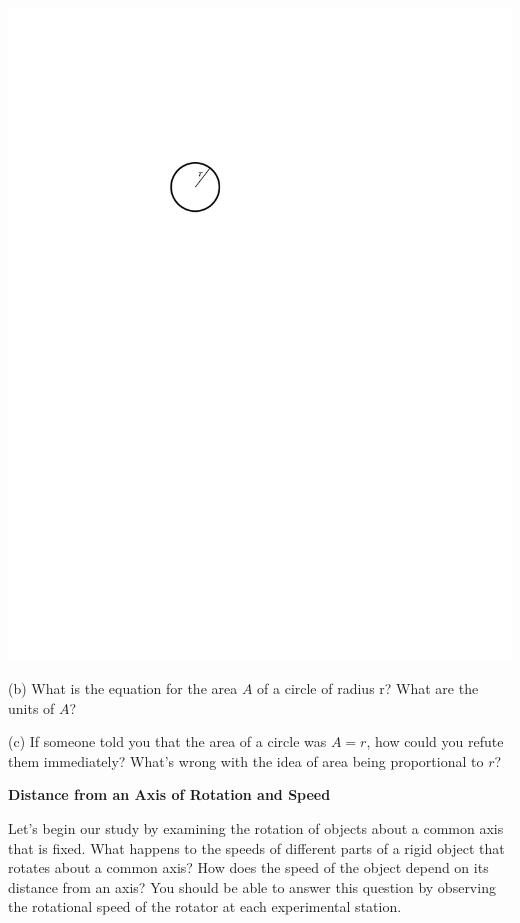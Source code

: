\vspace{0.3cm}
{\par\raggedright \includegraphics{rotation/just_a_circle.pdf} \par}
\answerspace{0.3cm}

(b) What is the equation for the area $A$ of a circle of radius r? What are
the units of $A$?
\answerspace{10mm}

(c) If someone told you that the area of a circle was $A = r$, how could you refute
them immediately? What's wrong with the idea of area being proportional to $r$?
\answerspace{20mm}

\pagebreak[3]

\textbf{Distance from an Axis of Rotation and Speed }

Let's begin our study by examining the rotation of objects about a common axis
that is fixed. What happens to the speeds of different parts of a rigid object
that rotates about a common axis? How does the speed of the object depend on
its distance from an axis? You should be able to answer this question by observing
the rotational speed of the rotator at each experimental station.

